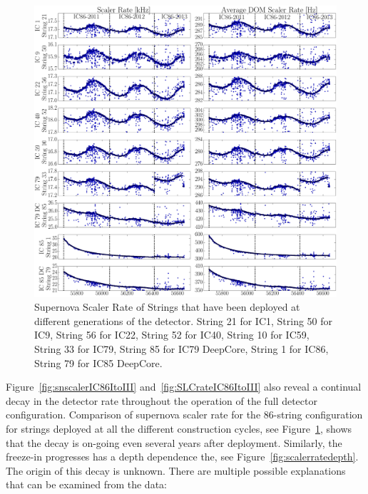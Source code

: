 \begin{figure}[h]
  \begin{center}
    \includegraphics[width=1\textwidth]{./figures/SNScalerRateAgeIC86I_III.png}
  \end{center}
  \caption{Supernova Scaler Rate of Strings that have been deployed at different generations of the detector. String 21 for IC1, String 50 for IC9, String 56 for IC22, String 52 for IC40, String 10 for IC59, String 33 for IC79, String 85 for IC79 DeepCore, String 1 for IC86, String 79 for IC85 DeepCore. \label{fig:scalerrateage}}   
\end{figure}

Figure~\ref{fig:snscalerIC86ItoIII} and~\ref{fig:SLCrateIC86ItoIII} also reveal a continual decay in the detector rate throughout the operation of the full detector configuration. Comparison of supernova scaler rate for the 86-string configuration for strings deployed at all the different construction cycles, see Figure~\ref{fig:scalerrateage}, shows that the decay is on-going even several years after deployment. Similarly, the freeze-in progresses has a depth dependence the, see Figure~\ref{fig:scalerratedepth}. The origin of this decay is unknown. There are multiple possible explanations that can be examined from the data:


